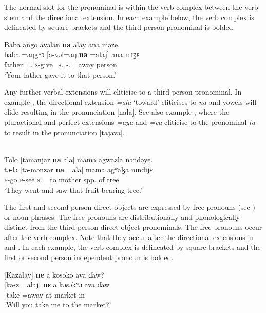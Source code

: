 The normal slot for the \DO pronominal is within the verb complex between the verb stem and the directional extension. In each example below, the verb complex is delineated by square brackets and the third person \DO pronominal is bolded.

\ea\label{ex:7:37}
Baba  ango  avəlan  \textbf{na}  alay  ana  məze.\\
\gll baba  =aŋgʷɔ  [a-vəl=aŋ  \textbf{na} =alaj]  ana  mɪʒɛ\\
father  ={\twoS}.{\POSS}  \textsc{s}-give=\textsc{s}.{\IO}  \textsc{s}.{\DO} =away    {\DAT} person\\
\glt ‘Your father gave it to that person.’  
\z

Any further verbal extensions will cliticise to a third person \DO pronominal. In example , the directional extension \textit{=ala} ‘toward’ cliticises to \textit{na} and vowels will elide resulting in the pronunciation [nala]. See also example , where the pluractional and perfect extensions \textit{=}\textit{aya} and \textit{=}\textit{va} cliticise to the \DO pronominal \textit{ta} to result in the pronunciation [tajava].  


\ea\label{ex:7:38}\\
Tolo  [təmənjar  \textbf{na}  ala]  mama  agwazla  nəndəye.\\
\gll tɔ{}-lɔ    [tə-mənzar  \textbf{na} =ala] mama  agʷaɮa   nɪndijɛ\\
\textsc{p}-go  \textsc{p}-see   \textsc{s}.{\DO}   =to  mother  {spp. of tree}  {\DEM}\\
\glt ‘They went and saw that fruit-bearing tree.’
\z

\largerpage
The first and second person direct objects are expressed by free pronouns (see ) or noun phrases. The free pronouns are distributionally and phonologically distinct from the third person direct object pronominals. The free pronouns occur after the verb complex. Note that they occur after the directional extensions in  and . In each example, the verb complex is delineated by square brackets and the first or second person independent pronoun is bolded.

\ea\label{ex:7:39}
[Kazalay]  \textbf{ne}  a  kosoko  ava  ɗaw?\\
\gll {}[ka-z  =alaj]    \textbf{nɛ}  a  kɔsɔkʷɔ  ava  ɗaw\\
{\twoS}-take  =away    {\oneS}  at  market  in  {\QUEST}\\
\glt ‘Will you take me to the market?’
\z

